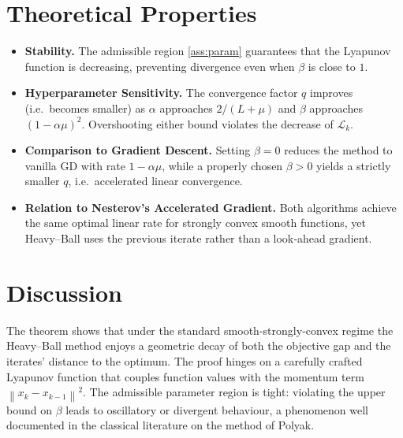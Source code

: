 \documentclass{article}
\newcommand{\norm}[1]{\left\lVert #1 \right\rVert}
\begin{document}
\section*{Theoretical Properties}
\begin{itemize}[leftmargin=*]
\item \textbf{Stability.} The admissible region \eqref{ass:param} guarantees that the Lyapunov function is decreasing, preventing divergence even when $\beta$ is close to $1$.
\item \textbf{Hyperparameter Sensitivity.} The convergence factor $q$ improves (i.e.\ becomes smaller) as $\alpha$ approaches $2/(L+\mu)$ and $\beta$ approaches $(1-\alpha\mu)^{2}$. Overshooting either bound violates the decrease of $\mathcal{L}_{k}$.
\item \textbf{Comparison to Gradient Descent.} Setting $\beta=0$ reduces the method to vanilla GD with rate $1-\alpha\mu$, while a properly chosen $\beta>0$ yields a strictly smaller $q$, i.e.\ accelerated linear convergence.
\item \textbf{Relation to Nesterov’s Accelerated Gradient.} Both algorithms achieve the same optimal linear rate for strongly convex smooth functions, yet Heavy–Ball uses the previous iterate rather than a look‑ahead gradient.
\end{itemize}

\section*{Discussion}
The theorem shows that under the standard smooth‑strongly‑convex regime the Heavy–Ball method enjoys a geometric decay of both the objective gap and the iterates’ distance to the optimum. The proof hinges on a carefully crafted Lyapunov function that couples function values with the momentum term $\norm{x_{k}-x_{k-1}}^{2}$. The admissible parameter region is tight: violating the upper bound on $\beta$ leads to oscillatory or divergent behaviour, a phenomenon well documented in the classical literature on the method of Polyak.

\newpage
\end{document}
